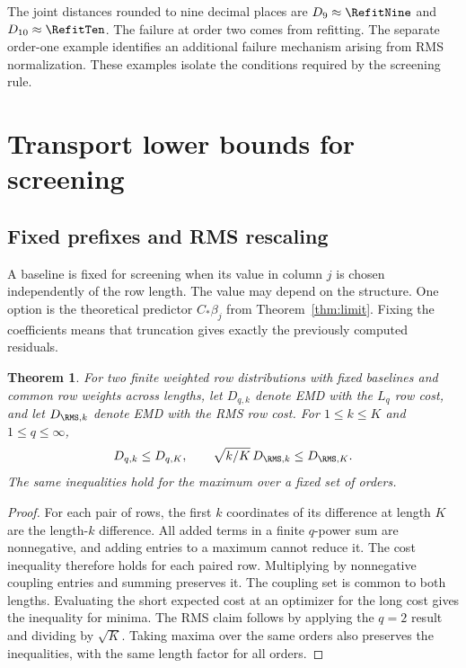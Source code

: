 \documentclass[11pt,a4paper]{article}
\newtheorem{theorem}{Theorem}
\theoremstyle{definition}
\begin{document}
The joint distances rounded to nine decimal places are \(D_9\approx\RefitNine\) and \(D_{10}\approx\RefitTen\). The failure at order two comes from refitting. The separate order-one example identifies an additional failure mechanism arising from RMS normalization. These examples isolate the conditions required by the screening rule.

\section{Transport lower bounds for screening}\label{sec:screening}

\subsection{Fixed prefixes and RMS rescaling}

A baseline is fixed for screening when its value in column \(j\) is chosen independently of the row length. The value may depend on the structure. One option is the theoretical predictor \(C_*\beta_j\) from Theorem~\ref{thm:limit}. Fixing the coefficients means that truncation gives exactly the previously computed residuals.

\begin{theorem}\label{thm:fixed}
For two finite weighted row distributions with fixed baselines and common row weights across lengths, let \(D_{q,k}\) denote EMD with the \(L_q\) row cost, and let \(D_{\RMS,k}\) denote EMD with the RMS row cost. For \(1\le k\le K\) and \(1\le q\le\infty\),
\begin{equation}\label{eq:fixed}
D_{q,k}\le D_{q,K},\qquad
\sqrt{k/K}\,D_{\RMS,k}\le D_{\RMS,K}.
\end{equation}
The same inequalities hold for the maximum over a fixed set of orders.
\end{theorem}

\begin{proof}
For each pair of rows, the first \(k\) coordinates of its difference at length \(K\) are the length-\(k\) difference. All added terms in a finite \(q\)-power sum are nonnegative, and adding entries to a maximum cannot reduce it. The cost inequality therefore holds for each paired row. Multiplying by nonnegative coupling entries and summing preserves it. The coupling set is common to both lengths. Evaluating the short expected cost at an optimizer for the long cost gives the inequality for minima. The RMS claim follows by applying the \(q=2\) result and dividing by \(\sqrt K\). Taking maxima over the same orders also preserves the inequalities, with the same length factor for all orders.
\end{proof}
\end{document}
